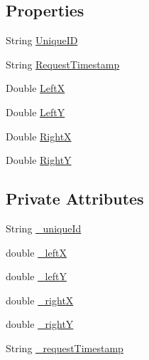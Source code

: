 \subsection*{Properties}
\begin{DoxyCompactItemize}
\item 
String \hyperlink{class_web_analyzer_1_1_models_1_1_message_model_1_1_data_message_af8ea083fd4035d8c786f5da12bc01917}{Unique\+I\+D}
\item 
String \hyperlink{class_web_analyzer_1_1_models_1_1_message_model_1_1_data_message_a5081299df6d4f2550151f95d58d098f4}{Request\+Timestamp}
\item 
Double \hyperlink{class_web_analyzer_1_1_models_1_1_message_model_1_1_data_message_adadb413f3e7d845538561b2a65596722}{Left\+X}
\item 
Double \hyperlink{class_web_analyzer_1_1_models_1_1_message_model_1_1_data_message_a409dc72ec09e601fbbd9dc4db680932c}{Left\+Y}
\item 
Double \hyperlink{class_web_analyzer_1_1_models_1_1_message_model_1_1_data_message_ab650b2ca778810b8a6fbd0d7530318a9}{Right\+X}
\item 
Double \hyperlink{class_web_analyzer_1_1_models_1_1_message_model_1_1_data_message_a3b554f231e24414cfa625552ff2635df}{Right\+Y}
\end{DoxyCompactItemize}
\subsection*{Private Attributes}
\begin{DoxyCompactItemize}
\item 
String \hyperlink{class_web_analyzer_1_1_models_1_1_message_model_1_1_data_message_a4c8a2ce0d65c6caae14863897eeb602d}{\+\_\+unique\+Id}
\item 
double \hyperlink{class_web_analyzer_1_1_models_1_1_message_model_1_1_data_message_ac9721293fa81833e18b244b11c6eed11}{\+\_\+left\+X}
\item 
double \hyperlink{class_web_analyzer_1_1_models_1_1_message_model_1_1_data_message_a093686b36f2a672787a3d2a7b03709c8}{\+\_\+left\+Y}
\item 
double \hyperlink{class_web_analyzer_1_1_models_1_1_message_model_1_1_data_message_a2fea12857a3954edd96d248fa4dbb673}{\+\_\+right\+X}
\item 
double \hyperlink{class_web_analyzer_1_1_models_1_1_message_model_1_1_data_message_a898ed683213c5e3ad74d42b9ecd4e590}{\+\_\+right\+Y}
\item 
String \hyperlink{class_web_analyzer_1_1_models_1_1_message_model_1_1_data_message_a57dbf763f6a16481703c56923aad5612}{\+\_\+request\+Timestamp}
\end{DoxyCompactItemize}
